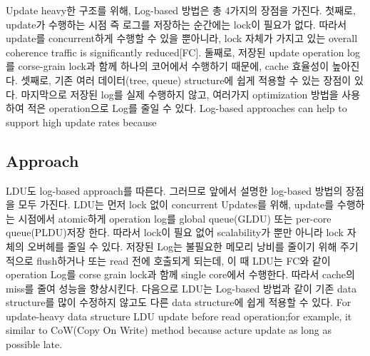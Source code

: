 \fi


%
\ifkor
Update heavy한 구조를 위해, Log-based 방법은 총 4가지의 장점을 가진다. 
첫째로, update가 수행하는 시점 즉 로그를 저장하는 순간에는 lock이 필요가 없다. 
따라서 update를 concurrent하게 수행할 수 있을 뿐아니라, lock 자체가 가지고 있는 overall
coherence traffic is significantly reduced[FC].
둘째로, 저장된 update operation log를 corse-grain lock과 함께 하나의 코어에서 수행하기 때문에, cache
효율성이 높아진다.
셋째로, 기존 여러 데이터(tree, queue) structure에 쉽게 적용할 수 있는 장점이 있다.
마지막으로 저장된 log를 실제 수행하지 않고, 여러가지 optimization 방법을 사용하여 적은 operation으로 Log를 줄일 수
있다. 
\else
Log-based approaches can help to support high update rates because
\fi



\subsection{Approach}


\ifkor
LDU도 log-based approach를 따른다. 그러므로 앞에서 설명한 log-based 방법의 장점을 모두 가진다.
LDU는 먼저 lock 없이 concurrent Updates를 위해, update를 수행하는 시점에서 atomic하게 operation
log를 global queue(GLDU) 또는 per-core queue(PLDU)저장 한다. 
따라서 lock이 필요 없어 scalability가 뿐만 아니라  lock 자체의 오버헤를 줄일 수 있다.
저장된 Log는 불필요한 메모리 낭비를 줄이기 위해 주기적으로 flush하거나 또는 read 전에 호출되게 되는데, 이 때 LDU는 FC와 같이
operation Log를 corse grain lock과 함께 single core에서 수행한다. 
따라서 cache의 miss를 줄여 성능을 향상시킨다.
다음으로 LDU는 Log-based 방법과 같이 기존 data structure를 많이 수정하지 않고도 다른 data structure에 쉽게
적용할 수 있다.
\else
For update-heavy data structure LDU update before read operation;for example, it
similar to CoW(Copy On Write) method because acture update as long as possible
late.
\fi




